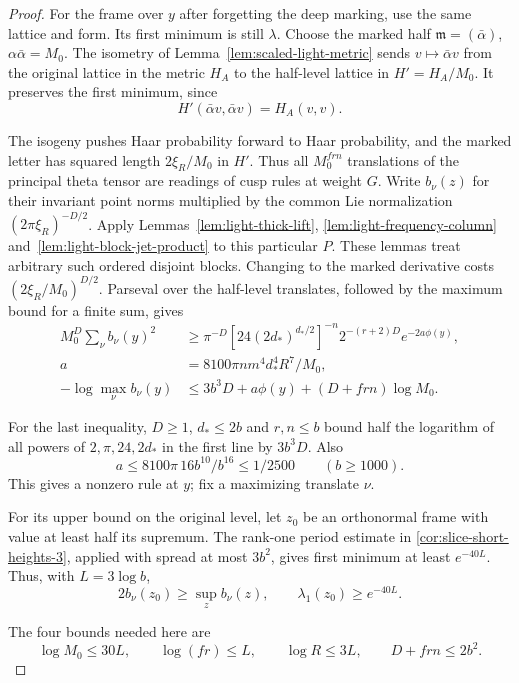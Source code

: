 \begin{proof}
For the frame over \(y\) after forgetting the deep marking, use
the same lattice and form. Its first minimum is still \(\lambda\).
Choose the marked half \(\mathfrak m=(\bar\alpha)\), \(\alpha\bar\alpha=M_0\).
The isometry of Lemma~\ref{lem:scaled-light-metric} sends \(v\mapsto\bar\alpha v\) from the original lattice in the metric \(H_A\) to the half-level lattice in \(H'=H_A/M_0\). It preserves the first minimum, since
\[
 H'(\bar\alpha v,\bar\alpha v)=H_A(v,v).
\]

The isogeny pushes Haar probability forward to Haar probability, and the marked letter has squared length \(2\xi_R/M_0\) in \(H'\). Thus all \(M_0^{frn}\) translations of the
principal theta tensor are readings of cusp rules at weight \(G\).
Write \(b_\nu(z)\) for their invariant point norms multiplied by
the common Lie normalization \((2\pi\xi_R)^{-D/2}\).
Apply Lemmas~\ref{lem:light-thick-lift}, \ref{lem:light-frequency-column}
and~\ref{lem:light-block-jet-product} to this particular \(P\).
These lemmas treat arbitrary such ordered disjoint blocks. Changing to the
marked derivative costs \((2\xi_R/M_0)^{D/2}\). Parseval over the
half-level translates, followed by the maximum bound for a finite sum,
gives
\[
 \begin{aligned}
 M_0^D\sum_\nu b_\nu(y)^2
    &\ge \pi^{-D}[24(2d_*)^{d_*/2}]^{-n}
            2^{-(r+2)D}e^{-2a\phi(y)},\\
 a&=8100\pi n m^4d_*^4R^7/M_0,\\
 -\log\max_\nu b_\nu(y)&\le
    3b^3D+a\phi(y)+(D+frn)\log M_0 .
 \end{aligned}
\]

For the last inequality, \(D\ge1\), \(d_*\le2b\) and \(r,n\le b\)
bound half the logarithm of all powers of \(2,\pi,24,2d_*\) in
the first line by \(3b^3D\). Also
\[
 a\le 8100\pi\,16 b^{10}/b^{16}\le 1/2500
 \qquad(b\ge1000).
\]
This gives a nonzero rule at \(y\); fix a maximizing translate \(\nu\).

For its upper bound on the original level, let \(z_0\) be an orthonormal frame with value at least half its supremum. The rank-one
period estimate in \ref{cor:slice-short-heights-3}, applied with
spread at most \(3b^2\), gives first minimum at least
\(e^{-40L}\). Thus, with \(L=3\log b\),
\[
 2b_\nu(z_0)\ge\sup_z b_\nu(z),\qquad \lambda_1(z_0)\ge e^{-40L}.
\]

The four bounds needed here are
\[
 \log M_0\le30L,\qquad
 \log(fr)\le L,\qquad
 \log R\le3L,\qquad
 D+frn\le2b^2.
\]


\end{proof}
